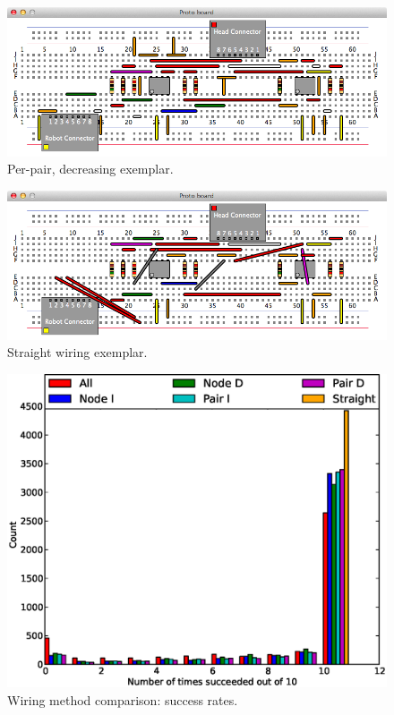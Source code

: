 \begin{figure}[H]
\begin{center}
\includegraphics[width=\textwidth]{Images/exemplar_per_pair_decreasing.png}
\caption{Per-pair, decreasing exemplar.}
\end{center}
\end{figure}

\begin{figure}[H]
\begin{center}
\includegraphics[width=\textwidth]{Images/exemplar_straight_wiring.png}
\caption{Straight wiring exemplar.}
\end{center}
\end{figure}

\begin{figure}[H]
\begin{center}
\includegraphics[width=\textwidth]{Images/wiring_success_comparison.eps}
\caption{Wiring method comparison: success rates.}
\label{fig:wiring_success}
\end{center}
\end{figure}

